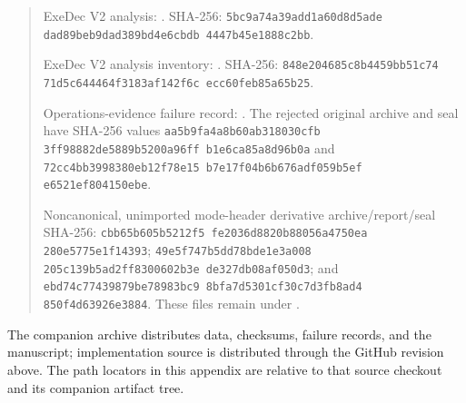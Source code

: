 \documentclass[twoside,11pt]{article}
\begin{document}
\begin{quote}
ExeDec V2 analysis:
.
SHA-256:
\texttt{5bc9a74a\allowbreak 39add1a6\allowbreak 0d8d5ade\allowbreak
dad89beb\allowbreak 9dad389b\allowbreak d4e6cbdb\allowbreak
4447b45e\allowbreak 1888c2bb}.\par
ExeDec V2 analysis inventory:
.
SHA-256:
\texttt{848e2046\allowbreak 85c8b445\allowbreak 9bb51c74\allowbreak
71d5c644\allowbreak 464f3183\allowbreak af142f6c\allowbreak
ecc60feb\allowbreak 85a65b25}.\par
Operations-evidence failure record:
.
The rejected original archive and seal have SHA-256 values
\texttt{aa5b9fa4\allowbreak a8b60ab3\allowbreak 18030cfb\allowbreak
3ff98882\allowbreak de5889b5\allowbreak 200a96ff\allowbreak
b1e6ca85\allowbreak a8d96b0a} and
\texttt{72cc4bb3\allowbreak 998380eb\allowbreak 12f78e15\allowbreak
b7e17f04\allowbreak b6b676ad\allowbreak f059b5ef\allowbreak
e6521ef8\allowbreak 04150ebe}.\par
Noncanonical, unimported mode-header derivative archive/report/seal SHA-256:
\texttt{cbb65b60\allowbreak 5b5212f5\allowbreak
fe2036d8\allowbreak 820b8805\allowbreak 6a4750ea\allowbreak
280e5775\allowbreak e1f14393};
\texttt{49e5f747\allowbreak b5dd78bd\allowbreak e1e3a008\allowbreak
205c139b\allowbreak 5ad2ff83\allowbreak 00602b3e\allowbreak
de327db0\allowbreak 8af050d3}; and
\texttt{ebd74c77\allowbreak 439879be\allowbreak 78983bc9\allowbreak
8bfa7d53\allowbreak 01cf30c7\allowbreak d3fb8ad4\allowbreak
850f4d63\allowbreak 926e3884}. These files remain under
.
\end{quote}
The companion archive distributes data, checksums, failure records, and the
manuscript; implementation source is distributed through the GitHub revision
above. The path locators in this appendix are relative to that source checkout
and its companion artifact tree.

{\small

}
\end{document}
